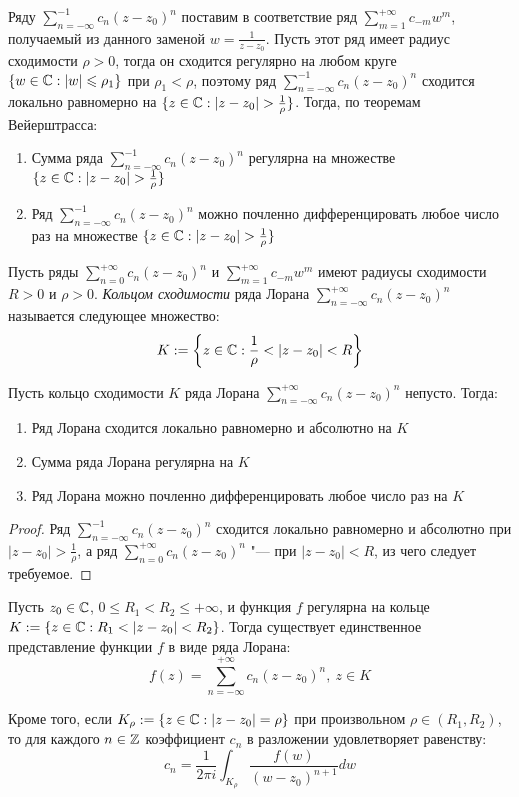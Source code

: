 \begin{note}
	Ряду $\sum_{n = -\infty}^{-1}c_n(z - z_0)^n$ поставим в соответствие ряд $\sum_{m = 1}^{+\infty}c_{-m}w^m$, получаемый из данного заменой $w = \frac1{z - z_0}$. Пусть этот ряд имеет радиус сходимости $\rho > 0$, тогда он сходится регулярно на любом круге $\{w \in \mathbb{C}: |w| \leqslant \rho_1\}$ при $\rho_1 < \rho$, поэтому ряд $\sum_{n = -\infty}^{-1}c_n(z - z_0)^n$ сходится локально равномерно на $\{z \in \mathbb{C}: |z - z_0| > \frac1\rho\}$. Тогда, по теоремам Вейерштрасса:
	\begin{enumerate}
		\item Сумма ряда $\sum_{n = -\infty}^{-1}c_n(z - z_0)^n$ регулярна на множестве $\{z \in \mathbb{C}: |z - z_0| > \frac1\rho\}$
		\item Ряд $\sum_{n = -\infty}^{-1}c_n(z - z_0)^n$ можно почленно дифференцировать любое число раз на множестве $\{z \in \mathbb{C}: |z - z_0| > \frac1\rho\}$
	\end{enumerate}
\end{note}

\begin{definition}
	Пусть ряды $\sum_{n = 0}^{+\infty}c_n(z - z_0)^n$ и $\sum_{m = 1}^{+\infty}c_{-m}w^m$ имеют радиусы сходимости $R > 0$ и $\rho > 0$. \textit{Кольцом сходимости} ряда Лорана $\sum_{n = -\infty}^{+\infty}c_n(z - z_0)^n$ называется следующее множество:
	\[K := \left\{z \in \mathbb{C}: \frac1\rho < |z - z_0| < R\right\}\]
\end{definition}

\begin{proposition}
	Пусть кольцо сходимости $K$ ряда Лорана $\sum_{n = -\infty}^{+\infty}c_n(z - z_0)^n$ непусто. Тогда:
	\begin{enumerate}
		\item Ряд Лорана сходится локально равномерно и абсолютно на $K$
		\item Сумма ряда Лорана регулярна на $K$
		\item Ряд Лорана можно почленно дифференцировать любое число раз на $K$
	\end{enumerate}
\end{proposition}

\begin{proof}
	Ряд $\sum_{n = -\infty}^{-1}c_n(z - z_0)^n$ сходится локально равномерно и абсолютно при $|z - z_0| > \frac{1}\rho$, а ряд $\sum_{n = 0}^{+\infty}c_n(z - z_0)^n$ "--- при $|z - z_0| < R$, из чего следует требуемое.
\end{proof}

\begin{theorem}
	Пусть $z_0 \in \mathbb{C}$, $0 \le R_1 < R_2 \le +\infty$, и функция $f$ регулярна на кольце $K := \{z \in \mathbb{C}: R_1 < |z - z_0| < R_2\}$. Тогда существует единственное представление функции $f$ в виде ряда Лорана:
	\[f(z) = \sum_{n = -\infty}^{+\infty}c_n(z - z_0)^n,~z \in K\]
	
	Кроме того, если $K_\rho := \{z \in \mathbb{C}: |z - z_0| = \rho\}$ при произвольном $\rho \in (R_1, R_2)$, то для каждого $n \in \mathbb{Z}$ коэффициент $c_n$ в разложении удовлетворяет равенству: \pagebreak
	\[c_n = \frac1{2\pi i}\int_{K_{\rho}} \frac{f(w)}{(w - z_0)^{n+1}}dw\]
\end{theorem}

